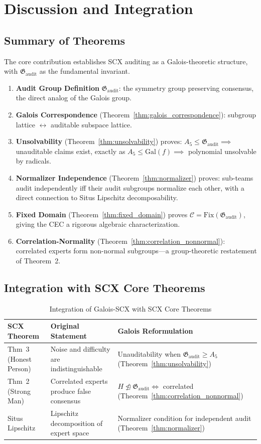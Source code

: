 \documentclass[12pt,a4paper]{article}
\theoremstyle{remark}
\newcommand{\Gal}{\mathrm{Gal}}
\newcommand{\Fix}{\mathrm{Fix}}
\newcommand{\NotNormal}{\ntrianglelefteq}
\newcommand{\AuditGrp}{\mathfrak{G}_{\mathrm{audit}}}
\newcommand{\CEC}{\mathcal{C}}
\begin{document}
\section{Discussion and Integration}
\subsection{Summary of Theorems}
The core contribution establishes SCX auditing as a Galois-theoretic structure, with \(\AuditGrp\) as the fundamental invariant.

\begin{enumerate}[label=(\arabic*),itemsep=3pt]
    \item \textbf{Audit Group Definition} \(\AuditGrp\): the symmetry group preserving consensus, the direct analog of the Galois group.
    \item \textbf{Galois Correspondence} (Theorem~\ref{thm:galois_correspondence}): subgroup lattice \(\leftrightarrow\) auditable subspace lattice.
    \item \textbf{Unsolvability} (Theorem~\ref{thm:unsolvability}) proves: \(A_5 \leq \AuditGrp \implies\) unauditable claims exist, exactly as \(A_5 \leq \Gal(f) \implies\) polynomial unsolvable by radicals.
    \item \textbf{Normalizer Independence} (Theorem~\ref{thm:normalizer}) proves: sub-teams audit independently iff their audit subgroups normalize each other, with a direct connection to Situs Lipschitz decomposability.
    \item \textbf{Fixed Domain} (Theorem~\ref{thm:fixed_domain}) proves \(\CEC = \Fix(\AuditGrp)\), giving the CEC a rigorous algebraic characterization.
    \item \textbf{Correlation-Normality} (Theorem~\ref{thm:correlation_nonnormal}): correlated experts form non-normal subgroups---a group-theoretic restatement of Theorem~2.
\end{enumerate}

\subsection{Integration with SCX Core Theorems}
\begin{table}[htbp]
\centering
\caption{Integration of Galois-SCX with SCX Core Theorems}
\label{tab:theorem_integration}
\begin{tabular}{@{}p{3cm} p{5cm} p{5cm}@{}}
\toprule
\textbf{SCX Theorem} & \textbf{Original Statement} & \textbf{Galois Reformulation} \\
\midrule
Thm~3 (Honest Person) & Noise and difficulty are indistinguishable & Unauditability when \(\AuditGrp \geq A_5\) (Theorem~\ref{thm:unsolvability})\\
Thm~2 (Strong Man) & Correlated experts produce false consensus & \(H \NotNormal \AuditGrp \iff\) correlated (Theorem~\ref{thm:correlation_nonnormal})\\
Situs Lipschitz & Lipschitz decomposition of expert space & Normalizer condition for independent audit (Theorem~\ref{thm:normalizer})\\
\bottomrule
\end{tabular}
\end{table}
\end{document}
